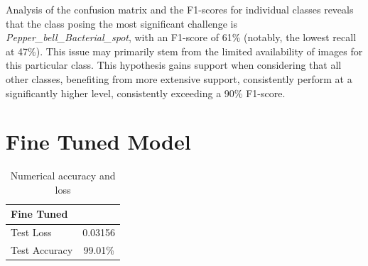 Analysis of the confusion matrix and the F1-scores for individual classes reveals that the class posing the most significant
challenge is \textit{Pepper\_bell\_Bacterial\_spot}, with an F1-score of 61\% (notably, the lowest recall at 47\%). 
This issue may primarily stem from the limited availability of images for this particular class. This hypothesis 
gains support when considering that all other classes, benefiting from more extensive support, consistently 
perform at a significantly higher level, consistently exceeding a 90\% F1-score.

\section{Fine Tuned Model}

\begin{table}[H]
    \centering
    \begin{tabular}{|l|c|}
        \hline
        \textbf{Fine Tuned} & \\
        \hline
            Test Loss & 0.03156 \\
            \hline
            Test Accuracy & 99.01\% \\
            \hline
        \end{tabular}
     \caption{Numerical accuracy and loss}
\end{table}

